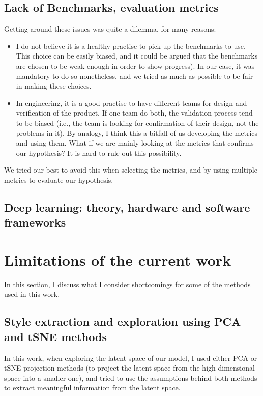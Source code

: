 \subsection{Lack of Benchmarks, evaluation metrics}
Getting around these issues was quite a dilemma, for many reasons:

\begin{itemize}
    \item I do not believe it is a healthy practise to pick up the benchmarks to use. This choice can be easily biased, and it could be argued that the benchmarks are chosen to be weak enough in order to show progress). In our case, it was mandatory to do so nonetheless, and we tried as much as possible to be fair in making these choices.
    \item In engineering, it is a good practise to have different teams for design and verification of the product. If one team do both, the validation process tend to be biased (i.e., the team is looking for confirmation of their design, not the problems in it). By analogy, I think this a bitfall of us developing the metrics and using them. What if we are mainly looking at the metrics that confirms our hypothesis? It is hard to rule out this possibility. 
\end{itemize}

We tried our best to avoid this when selecting the metrics, and by using multiple metrics to evaluate our hypothesis.

\subsection{Deep learning: theory, hardware and software frameworks}
\par

\section{Limitations of the current work}
In this section, I discuss what I consider shortcomings for some of the methods used in this work.

\subsection{Style extraction and exploration using PCA and tSNE methods}
In this work, when exploring the latent space of our model, I used either PCA or tSNE projection methods (to project the latent space from the high dimensional space into a smaller one), and tried to use the assumptions behind both methods to extract meaningful information from the latent space.


